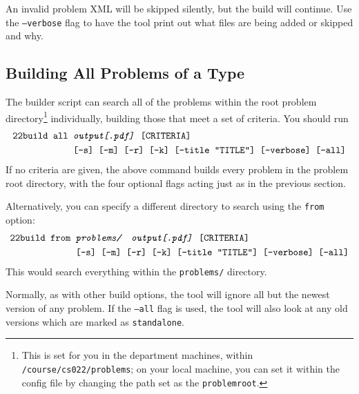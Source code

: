     An invalid problem XML will be skipped silently, but the build will
    continue. Use the \texttt{--verbose} flag to have the tool print out 
    what files are being added or skipped and why.
  \subsection{Building All Problems of a Type}
    The builder script can search all of the problems within the root problem 
    directory\footnote{This is set for you in the department machines, within 
    \texttt{/course/cs022/problems}; on your local machine, you can set it 
    within the config file by changing the path set as the 
    \texttt{problemroot}.} 
    individually, building those that meet a set of criteria. You should run
    \begin{align*}
      \texttt{22build }\texttt{all }&\texttt{\textit{output[.pdf]} [CRITERIA]}\\
      ~&\texttt{[-s] [-m] [-r] [-k] [--title ``TITLE''] [--verbose] [--all]}
    \end{align*}
    If no criteria are given, the above command builds every problem in 
    the problem root directory, with the four optional flags acting just 
    as in the previous section.
    
    Alternatively, you can specify a different directory to search using 
    the \texttt{from} option:
    \begin{align*}
      \pybuild\texttt{from }&\texttt{\textit{problems/\ \ output[.pdf]} [CRITERIA]}\\
      ~&\texttt{[-s] [-m] [-r] [-k] [--title ``TITLE''] [--verbose] [--all]}
    \end{align*}
    This would search everything within the \texttt{problems/} directory.
    
    Normally, as with other build options, the tool will ignore all but
    the newest version of any problem. If the \texttt{--all} flag is used,
    the tool will also look at any old versions which are marked as
    \texttt{standalone}.
    
